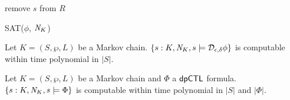 \begin{algorithm}
  \begin{algorithmic}[1]
    \Match{$\phi$}
    \Case{$\X \Psi$} 
    \EndCase
    \EndCase
    \EndMatch
        {remove $s$ from $R$}
        \EndIf
      \EndFor
    \EndFor
    
    \EndFunction
  \end{algorithmic}
  \caption{SAT($\phi$, $\mathit{N}_{K}$)}
  \label{algorithm:sat-dpriv-dtmc}
\end{algorithm}

\begin{proposition}
  Let $K = (S, \wp, L)$ be a Markov chain.
  $\{ s : K, \mathit{N}_{K}, s \models \mathcal{D}_{{\epsilon}, {\delta}} \phi \}$ is
  computable within time polynomial in $|S|$.
\end{proposition}

\begin{corollary}
  Let $K = (S, \wp, L)$ be a Markov chain and $\Phi$ a $\textsf{dpCTL}$
  formula. $\{ s : K, \mathit{N}_{K}, s \models \Phi \}$ is
  computable within time polynomial in $|S|$ and $|\Phi|$.
\end{corollary}

